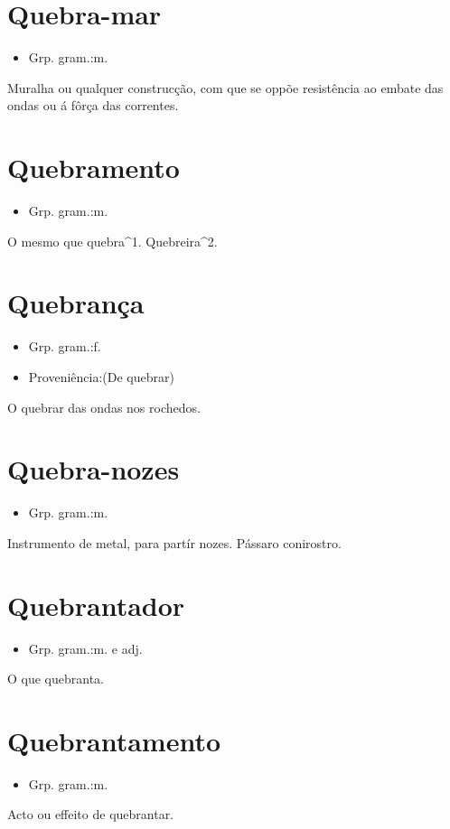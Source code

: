 \section{Quebra-mar}
\begin{itemize}
\item {Grp. gram.:m.}
\end{itemize}
Muralha ou qualquer construcção, com que se oppõe resistência ao embate das ondas ou á fôrça das correntes.
\section{Quebramento}
\begin{itemize}
\item {Grp. gram.:m.}
\end{itemize}
O mesmo que \textunderscore quebra\textunderscore ^1.
Quebreira^2.
\section{Quebrança}
\begin{itemize}
\item {Grp. gram.:f.}
\end{itemize}
\begin{itemize}
\item {Proveniência:(De \textunderscore quebrar\textunderscore )}
\end{itemize}
O quebrar das ondas nos rochedos.
\section{Quebra-nozes}
\begin{itemize}
\item {Grp. gram.:m.}
\end{itemize}
Instrumento de metal, para partír nozes.
Pássaro conirostro.
\section{Quebrantador}
\begin{itemize}
\item {Grp. gram.:m.  e  adj.}
\end{itemize}
O que quebranta.
\section{Quebrantamento}
\begin{itemize}
\item {Grp. gram.:m.}
\end{itemize}
Acto ou effeito de quebrantar.
